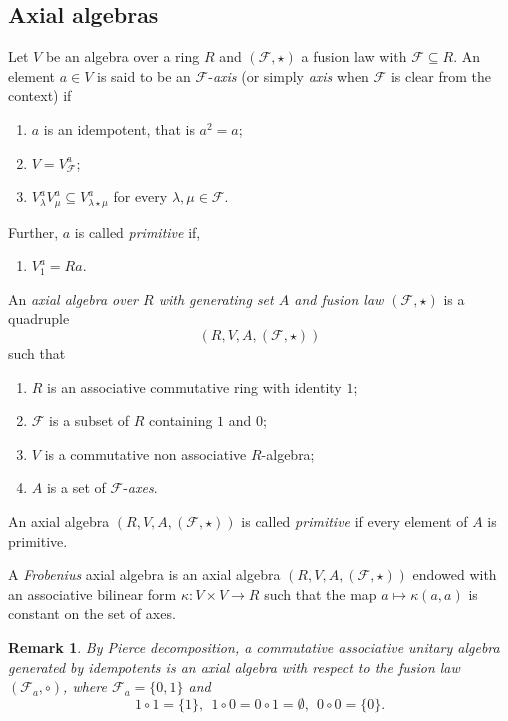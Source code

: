 \documentclass[a4paper]{amsart}
\newtheorem{remark}[lemma]{Remark}
\begin{document}
\subsection{Axial algebras}
Let $V$ be an algebra over a ring $R$ and $ (\mathcal F, \star)$ a fusion law with $\mathcal F\subseteq R$. 
An element $a\in V$ is said to be an $\mathcal F$-{\it axis} (or simply {\it axis} when $\mathcal F$ is clear from the context) if
\begin{enumerate}
\item [Ax0] $a$ is an idempotent, that is $a^2=a$;
\item[Ax1] $V=V_{\mathcal F}^a$;
\item[Ax2] $V_\lambda^a V_\mu^a \subseteq V_{\lambda\star \mu}^a$ for every $\lambda, \mu \in \mathcal F$. 
\end{enumerate}
Further, $a$ is called {\it primitive} if, 
\begin{enumerate}
\item[Ax3]   $V_1^a=Ra$.
\end{enumerate}
An {\it axial algebra over $R$  with generating set $A$ and fusion law $(\mathcal F, \star)$} is a quadruple 
$$(R,V, A, (\mathcal F, \star))$$
such that 
\begin{enumerate}
\item $R$ is an associative commutative ring with identity $1$;
\item $\mathcal F$ is a subset of $R$ containing $1$ and $0$; 
\item $V$ is a commutative non associative $R$-algebra;
\item $A$ is a set of $\mathcal F$-{\it axes}.
\end{enumerate} 
An axial algebra $(R,V, A, (\mathcal F, \star))$ is called {\it primitive} if every element of $A$ is primitive.

A {\it Frobenius} axial algebra is an axial algebra $(R,V, A, (\mathcal F, \star))$ endowed with an associative bilinear form $\kappa:V\times V\to R$ such that the map $a\mapsto \kappa(a,a)$ is constant on the set of axes.

\begin{remark}\label{associative}
By Pierce decomposition, a commutative associative unitary algebra generated by idempotents is an axial algebra with respect to the fusion law $(\mathcal F_a, \circ)$, where $\mathcal F_a=\{0,1\}$ and 
$$
1\circ 1=\{1\}, \:\:1\circ 0=0\circ 1=\emptyset,  \:\:0\circ 0=\{0\}.
$$
 \end{remark}
 
\end{document}
